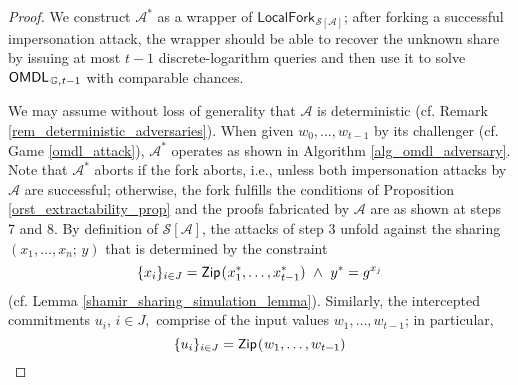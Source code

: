 \documentclass{iacrtrans}
\begin{document}
\begin{proof}
We construct $\mathcal{A}^*$ as a wrapper of
$
\mathsf{LocalFork}_{
		\hspace{1pt}
    	\mathcal{S}\hspace{0pt}[
    		\hspace{0pt}
    		\mathcal{A}
    		\hspace{0pt}
    	]
    }
$;
after forking a successful impersonation attack,
the wrapper should be able to recover the unknown share
by issuing at most $t-1$ discrete-logarithm queries
and then use it to solve
$\mathsf{OMDL}_{\hspace{1pt}\mathbb{G},\hspace{0.5pt} t-1}$
with comparable chances.

We may assume without loss of generality that $\mathcal{A}$
is deterministic (cf. Remark \ref{rem_deterministic_adversaries}).
When given $w_0, \dots, w_{t-1}$
by its challenger
(cf. Game \ref{omdl_attack}),
$\mathcal{A}^*$ operates as shown in Algorithm \ref{alg_omdl_adversary}.
Note that $\mathcal{A}^*$
aborts if the fork aborts,
i.e., unless both impersonation attacks by $\mathcal{A}$
are successful;
otherwise, the fork fulfills the conditions of
Proposition \ref{orst_extractability_prop}
and the proofs fabricated by $\mathcal{A}$
are as shown at steps 7 and 8.
By definition of
$\mathcal{S}\hspace{0pt}[
 	\hspace{0pt}
    \mathcal{A}
    \hspace{0pt}
    ]
$,
the attacks of step 3
unfold against the sharing $(x_1, \dots, x_n;\hspace{2pt} y)$
that is determined by the constraint
\vspace{5pt}
\begin{equation}\label{mt_1}
\{x_i\}_{i \in J} =
\mathsf{Zip}\hspace{0.75pt}
(\hspace{0.5pt}x_1^*, \dots, x_{t-1}^*)
\ \land
\ y^* = g ^ {x_j}
\vspace{5pt}
\end{equation}
(cf. Lemma \ref{shamir_sharing_simulation_lemma}).
Similarly, the intercepted commitments
$u_i,\hspace{2pt} i \in J,$
comprise of the input values $w_1, \dots, w_{t-1}$;
in particular,
\vspace{3pt}
\begin{equation}\label{mt_2}
\{u_i\}_{i \in J} =
\mathsf{Zip}\hspace{0.75pt}
(\hspace{0.5pt}w_1, \dots, w_{t-1})

\end{equation}
\end{proof}
\end{document}
